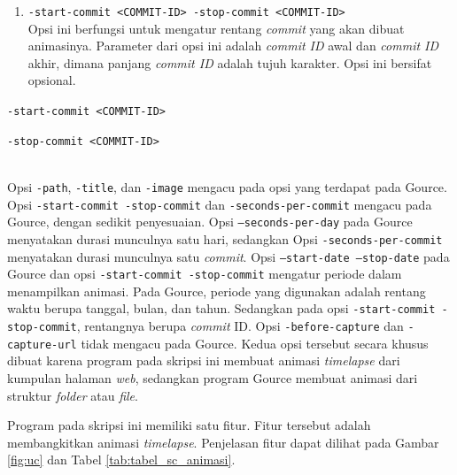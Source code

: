 \begin{enumerate}
\item \texttt{-start-commit <COMMIT-ID> -stop-commit <COMMIT-ID>}\\
Opsi ini berfungsi untuk mengatur rentang \textit{commit} yang akan dibuat animasinya. Parameter dari opsi ini adalah \textit{commit ID} awal dan \textit{commit ID} akhir, dimana panjang \textit{commit ID} adalah tujuh karakter. Opsi ini bersifat opsional. 
\end{enumerate}

\item \texttt{-start-commit <COMMIT-ID>}

\item \texttt{-stop-commit <COMMIT-ID>}

\ \\
Opsi \texttt{-path}, \texttt{-title}, dan \texttt{-image} mengacu pada opsi yang terdapat pada Gource. Opsi \texttt{-start-commit -stop-commit} dan \texttt{-seconds-per-commit} mengacu pada Gource, dengan sedikit penyesuaian.  Opsi \texttt{--seconds-per-day} pada Gource menyatakan durasi munculnya satu hari, sedangkan Opsi \texttt{-seconds-per-commit} menyatakan durasi munculnya satu \textit{commit}. Opsi \texttt{--start-date --stop-date} pada Gource dan opsi \texttt{-start-commit -stop-commit} mengatur periode dalam menampilkan animasi. Pada Gource, periode yang digunakan adalah rentang waktu berupa tanggal, bulan, dan tahun. Sedangkan pada opsi \texttt{-start-commit -stop-commit}, rentangnya berupa \textit{commit} ID. Opsi \texttt{-before-capture} dan \texttt{-capture-url} tidak mengacu pada Gource. Kedua opsi tersebut secara khusus dibuat karena program pada skripsi ini membuat animasi \textit{timelapse} dari kumpulan halaman \textit{web}, sedangkan program Gource membuat animasi dari struktur \textit{folder} atau \textit{file}.           
  
 
Program pada skripsi ini memiliki satu fitur. Fitur tersebut adalah membangkitkan animasi \textit{timelapse}.
Penjelasan fitur dapat dilihat pada Gambar \ref{fig:uc} dan Tabel \ref{tab:tabel_sc_animasi}.


